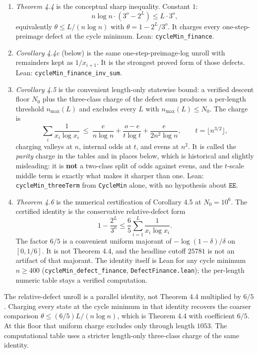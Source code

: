 \documentclass[12pt]{article}
\begin{document}
\begin{enumerate}
\def\labelenumi{\arabic{enumi}.}
\item
  \emph{Theorem 4.4} is the conceptual sharp inequality. Constant \(1\):
  \[
  n\log n\cdot(3^o-2^L)\le L\cdot 3^o,
  \] equivalently \(\theta\le L/(n\log n)\) with \(\theta=1-2^L/3^o\).
  It charges every one-step-preimage defect at the cycle minimum. Lean:
  \texttt{\nolinkurl{cycleMin_finance}}.
\item
  \emph{Corollary 4.4c} (below) is the same one-step-preimage-log unroll
  with remainders kept as \(1/x_{i+1}\). It is the strongest proved form
  of those defects. Lean: \texttt{\nolinkurl{cycleMin_finance_inv_sum}}.
\item
  \emph{Corollary 4.5} is the convenient length-only statewise bound: a
  verified descent floor \(N_0\) plus the three-class charge of the
  defect sum produces a per-length threshold \(n_{\max}(L)\) and
  excludes every \(L\) with \(n_{\max}(L)\le N_0\). The charge is \[
  \sum_i \frac1{x_i\log x_i}\ \le\
  \frac{e}{n\log n}+\frac{o-e}{t\log t}+\frac{e}{2n^{2}\log n},
  \qquad t=\lfloor n^{3/2}\rfloor ,
  \] charging valleys at \(n\), internal odds at \(t\), and evens at
  \(n^{2}\). It is called the \emph{parity} charge in the tables and in
  places below, which is historical and slightly misleading: it is
  \textbf{not} a two-class split of odds against evens, and the
  \(t\)-scale middle term is exactly what makes it sharper than one.
  Lean: \texttt{\nolinkurl{cycleMin_threeTerm}} from
  \texttt{\nolinkurl{CycleMin}} alone, with no hypothesis about
  \(\mathtt{EE}\).
\item
  \emph{Theorem 4.6} is the numerical certification of Corollary 4.5 at
  \(N_0=10^6\). The certified identity is the conservative
  relative-defect form \[
  1-\frac{2^L}{3^o}
  \le
  \frac65\sum_{i=1}^{L}\frac{1}{x_i\log x_i}.
  \] The factor \(6/5\) is a convenient uniform majorant of
  \(-\log(1-\delta)/\delta\) on \([0,1/6]\). It is not Theorem 4.4, and
  the headline cutoff \(25781\) is not an artifact of that majorant. The
  identity itself is Lean for any cycle minimum \(n\ge 400\)
  (\texttt{\nolinkurl{cycleMin_defect_finance}},
  \texttt{\nolinkurl{DefectFinance.lean}}); the per-length numeric table
  stays a verified computation.
\end{enumerate}

The relative-defect unroll is a parallel identity, not Theorem 4.4
multiplied by \(6/5\). Charging every state at the cycle minimum in that
identity recovers the coarser comparison \(\theta\le(6/5)L/(n\log n)\),
which is Theorem 4.4 with coefficient \(6/5\). At this floor that
uniform charge excludes only through length \(1053\). The computational
table uses a stricter length-only three-class charge of the same
identity.
\end{document}
